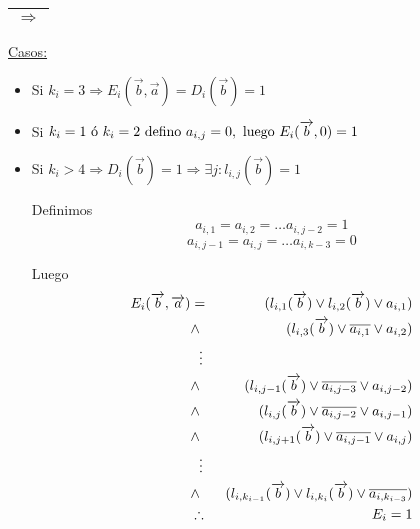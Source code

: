 \documentclass[12pt,a4paper]{report}
\begin{document}
		\vspace{5mm}
		\begin{tabular}{|c|} \hline $\Rightarrow$ \\\hline \end{tabular}

				\vspace{3mm}
				\underline{Casos:}
				\begin{itemize}
					\item Si $k_{i} = 3 \Rightarrow E_{i}(\overrightarrow{b}, \overrightarrow{a}) = D_{i}(\overrightarrow{b}) = 1$
					\item Si $k_{i} = 1 \textup{ ó } k_{i} = 2 \textup{ defino } a_{i, j} = 0, \textup{ luego } E_{i}(\overrightarrow{b}, 0) = 1$
					\item Si $k_{i} > 4 \Rightarrow D_{i}(\overrightarrow{b}) = 1 \Rightarrow \exists j : l_{i, j}(\overrightarrow{b}) = 1$

						\par Definimos
							\[ a_{i, 1} = a_{i, 2} = \dotsc a_{i, j-2} = 1 \]
							\[ a_{i, j-1} = a_{i, j} = \dotsc a_{i, k-3} = 0 \]

						\par Luego
						\begin{eqnarray}
							\nonumber E_{i}(\overrightarrow{b}, \overrightarrow{a}) &=& (l_{i, 1}(\overrightarrow{b}) \vee l_{i, 2}(\overrightarrow{b}) \vee a_{i, 1}) \\
							\nonumber &\wedge & (l_{i, 3}(\overrightarrow{b}) \vee \overline{a_{i, 1}} \vee a_{i, 2}) \\
							\nonumber &\vdotswithin{\ldots}& \\
							\nonumber &\wedge & (l_{i, j-1}(\overrightarrow{b}) \vee \overline{a_{i, j-3}} \vee a_{i, j-2}) \\
							\nonumber &\wedge & (l_{i, j}(\overrightarrow{b}) \vee \overline{a_{i, j-2}} \vee a_{i, j-1}) \\
							\nonumber &\wedge & (l_{i, j+1}(\overrightarrow{b}) \vee \overline{a_{i, j-1}} \vee a_{i, j}) \\
							\nonumber &\vdotswithin{\ldots}& \\
							\nonumber &\wedge & (l_{i, k_{i-1}}(\overrightarrow{b}) \vee l_{i, k_{i}}(\overrightarrow{b}) \vee \overline{a_{i, k_{i-3}}}) \\
							\nonumber &\therefore & E_{i} = 1
						\end{eqnarray}
				\end{itemize}
\end{document}
